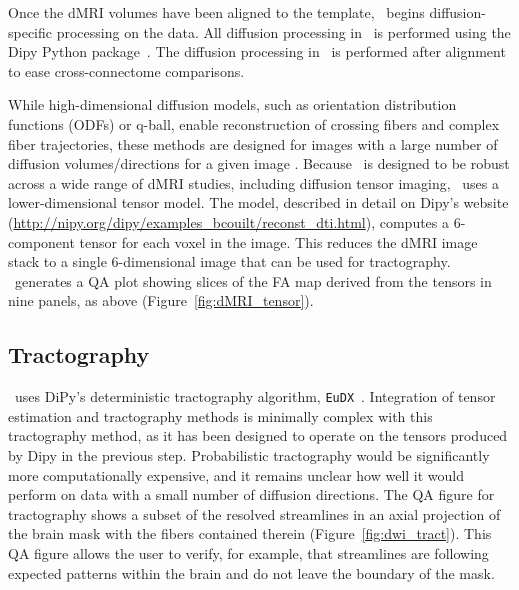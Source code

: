 \documentclass[11pt]{article}
\begin{document}
Once the dMRI volumes have been aligned to the template, \ndmg~begins diffusion-specific processing on the data.
All diffusion processing in \ndmg~is performed using the Dipy Python package~\cite{dipy}.
The diffusion processing in \ndmg~is
performed after alignment to ease cross-connectome comparisons.

While high-dimensional diffusion models, such as orientation distribution functions (ODFs) or q-ball,  enable
reconstruction of crossing fibers and complex fiber trajectories, these methods are designed for images with  a large number of diffusion volumes/directions for a given image \cite{odf, qball}. 
Because \ndmg~is
designed to be robust across a wide range of dMRI studies, including diffusion tensor imaging, \ndmg~uses a lower-dimensional tensor model. The
model, described in detail on Dipy's website (\url{http://nipy.org/dipy/examples_bcouilt/reconst_dti.html}),
computes a 6-component tensor for each voxel in the image.  This reduces the dMRI image stack to a single 6-dimensional image that can be
used for tractography.
\ndmg~generates a QA plot showing slices of the FA map derived from the tensors in nine panels, as above (Figure~\ref{fig:dMRI_tensor}).


\subsection{Tractography}
\label{app:tractography}





\ndmg~uses DiPy's  deterministic tractography algorithm, \texttt{EuDX}~\cite{eudx}. 
Integration of tensor estimation and tractography methods is minimally complex
with this tractography method, as it has been designed to operate on the tensors produced by Dipy in the previous step.
Probabilistic tractography would be significantly more computationally expensive, and it remains unclear how well it would perform on data with a small number of diffusion directions.
%
The QA figure for tractography shows a subset of the resolved streamlines  in an axial projection of the brain mask with the fibers contained therein (Figure~\ref{fig:dwi_tract}). 
This QA figure allows the user to verify, for example, that streamlines are following expected patterns within the brain and do not leave the
boundary of the mask.
\end{document}
